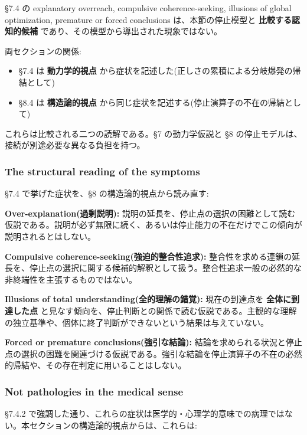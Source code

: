 \S{}7.4 の explanatory overreach, compulsive coherence-seeking, illusions of global optimization, premature or forced conclusions は、本節の停止模型と \textbf{比較する認知的候補} であり、その模型から導出された現象ではない。

両セクションの関係:

\begin{itemize}
\item \S{}7.4 は \textbf{動力学的視点} から症状を記述した(正しさの累積による分岐爆発の帰結として)
\item \S{}8.4 は \textbf{構造論的視点} から同じ症状を記述する(停止演算子の不在の帰結として)
\end{itemize}

これらは比較される二つの読解である。\S{}7 の動力学仮説と \S{}8 の停止モデルは、接続が別途必要な異なる負担を持つ。

\subsubsection{The structural reading of the symptoms}


\S{}7.4 で挙げた症状を、\S{}8 の構造論的視点から読み直す:

\textbf{Over-explanation(過剰説明):}
説明の延長を、停止点の選択の困難として読む仮説である。説明が必ず無限に続く、あるいは停止能力の不在だけでこの傾向が説明されるとはしない。

\textbf{Compulsive coherence-seeking(強迫的整合性追求):}
整合性を求める連鎖の延長を、停止点の選択に関する候補的解釈として扱う。整合性追求一般の必然的な非終端性を主張するものではない。

\textbf{Illusions of total understanding(全的理解の錯覚):}
現在の到達点を \textbf{全体に到達した点} と見なす傾向を、停止判断との関係で読む仮説である。主観的な理解の独立基準や、個体に終了判断ができないという結果は与えていない。

\textbf{Forced or premature conclusions(強引な結論):}
結論を求められる状況と停止点の選択の困難を関連づける仮説である。強引な結論を停止演算子の不在の必然的帰結や、その存在判定に用いることはしない。

\subsubsection{Not pathologies in the medical sense}


\S{}7.4.2 で強調した通り、これらの症状は医学的・心理学的意味での病理ではない。本セクションの構造論的視点からは、これらは:


